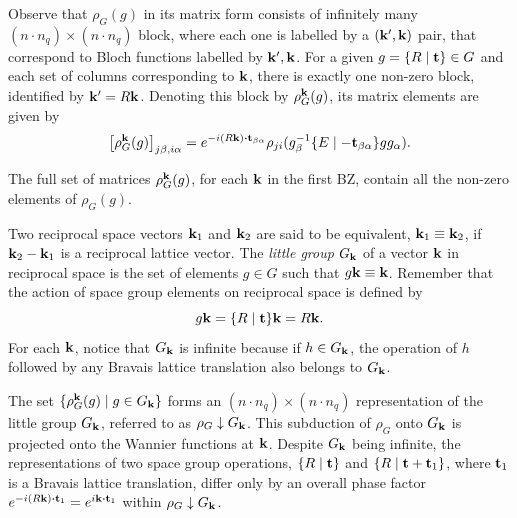 Observe that $\rho_G(g)$ in its matrix form consists of infinitely many $(n\cdot n_q)\times (n\cdot n_q)$ block, where each one is labelled by a $({\vb{k}}', {\vb{k}})$ pair, that correspond to Bloch functions labelled by ${\vb{k}}', {\vb{k}}$. For a given $g = \{ R \mid {\vb{t}} \} \in G$ and each set of columns corresponding to ${\vb{k}}$, there is exactly one non-zero block, identified by ${\vb{k}}' = R{\vb{k}}$. Denoting this block by $\rho_G^{\vb{k}}(g)$, its matrix elements are given by
\begin{equation} \label{eq:k_block_inducedrep_jbia}
\qty[\rho_G^\k(g)]_{j\beta,i\alpha} = e^{-i(R\k)\vdot\t_{\beta\alpha}}\rho_{ji}(g_\beta^{-1}\sg{E}{-\t_{\beta\alpha}}gg_\alpha).
\end{equation}

The full set of matrices $\rho_G^{\vb{k}}(g)$, for each ${\vb{k}}$ in the first BZ, contain all the non-zero elements of $\rho_G(g)$.


\begin{definition}
Two reciprocal space vectors ${\vb{k}}_1$ and ${\vb{k}}_2$ are said to be equivalent, ${\vb{k}}_1 \equiv {\vb{k}}_2$, if ${\vb{k}}_2 - {\vb{k}}_1$ is a reciprocal lattice vector. The \textit{little group} $G_{\vb{k}}$ of a vector ${\vb{k}}$ in reciprocal space is the set of elements $g \in G$ such that $g {\vb{k}} \equiv {\vb{k}}$. Remember that the action of space group elements on reciprocal space is defined by
$$
g{\vb{k}} = \{ R \mid {\vb{t}} \}{\vb{k}} = R{\vb{k}}.
$$
For each ${\vb{k}}$, notice that $G_{\vb{k}}$ is infinite because if $h \in G_{\vb{k}}$, the operation of $h$ followed by any Bravais lattice translation also belongs to $G_{\vb{k}}$.
\end{definition}

\n

The set \(\{\rho_G^{\vb{k}}(g) \mid g \in G_{\vb{k}}\}\) forms an \((n \cdot n_q) \times (n \cdot n_q)\) representation of the little group \(G_{\vb{k}}\), referred to as \(\rho_G \downarrow G_{\vb{k}}\). This subduction of \(\rho_G\) onto \(G_{\vb{k}}\) is projected onto the Wannier functions at \({\vb{k}}\). Despite \(G_{\vb{k}}\) being infinite, the representations of two space group operations, \(\{ R \mid {\vb{t}} \}\) and \(\{ R \mid {\vb{t}} + {\vb{t}}_1 \}\), where \({\vb{t}}_1\) is a Bravais lattice translation, differ only by an overall phase factor \(e^{-i(R\k) \vdot \t_1} = e^{i\k \vdot \t_1}\) within \(\rho_G \downarrow G_{\vb{k}}\).

